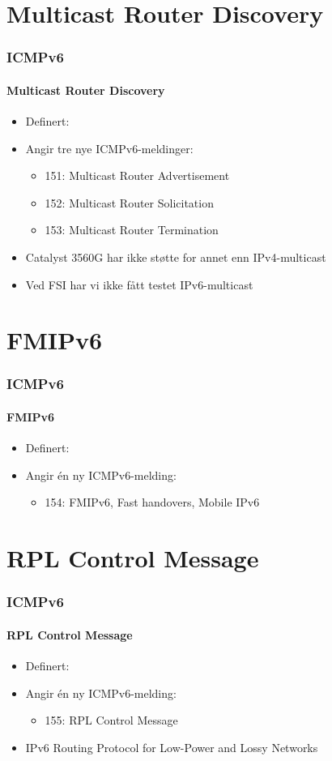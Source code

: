 \section{Multicast Router Discovery}
\begin{frame}%
  \frametitle{ICMPv6}
  \framesubtitle{Multicast Router Discovery}
  \begin{itemize}%
  \item Definert: 
  \item Angir tre nye ICMPv6-meldinger:
    \begin{itemize}%
    \item 151: Multicast Router Advertisement
    \item 152: Multicast Router Solicitation
    \item 153: Multicast Router Termination
    \end{itemize}
  \item Catalyst 3560G har ikke støtte for annet enn IPv4-multicast
  \item Ved FSI har vi ikke fått testet IPv6-multicast
  \end{itemize}
\end{frame}

\section{FMIPv6}
\begin{frame}%
  \frametitle{ICMPv6}
  \framesubtitle{FMIPv6}
  \begin{itemize}%
  \item Definert: 
  \item Angir én ny ICMPv6-melding:
    \begin{itemize}%
    \item 154: FMIPv6, Fast handovers, Mobile IPv6
    \end{itemize}
  \end{itemize}
\end{frame}

\section{RPL Control Message}
\begin{frame}%
  \frametitle{ICMPv6}
  \framesubtitle{RPL Control Message}
  \begin{itemize}%
  \item Definert: 
  \item Angir én ny ICMPv6-melding:
    \begin{itemize}%
    \item 155: RPL Control Message
    \end{itemize}
  \item IPv6 Routing Protocol for Low-Power and Lossy Networks
  \end{itemize}
\end{frame}

